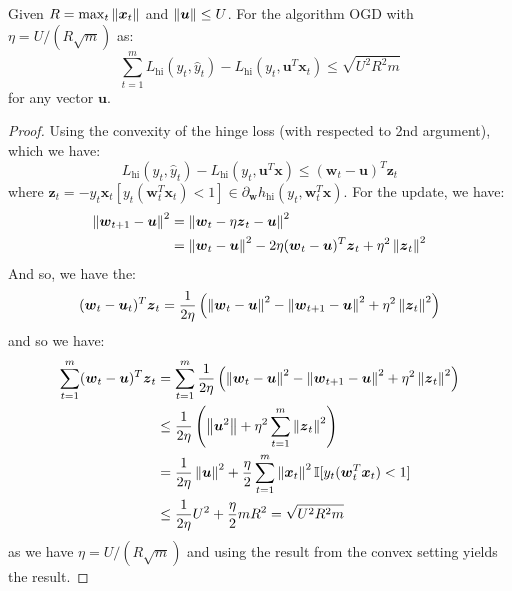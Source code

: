 \begin{theorem}
    Given $R = \max_t\left\lVert\boldsymbol x_t\right\rVert$ and $\left\lVert\boldsymbol u\right\rVert \le U$. For the algorithm OGD with $\eta = U/(R\sqrt{m})$ as:
    \begin{equation*}
        \sum^m_{t=1}L_\text{hi}(y_t, \hat{y}_t) - L_\text{hi}(y_t, \boldsymbol u^T\boldsymbol x_t) \le \sqrt{U^2R^2m}
    \end{equation*}
    for any vector $\boldsymbol u$.
\end{theorem}
\begin{proof}
    Using the convexity of the hinge loss (with respected to 2nd argument), which we have:
    \begin{equation*}
        L_\text{hi}(y_t,\hat{y}_t) - L_\text{hi}(y_t, \boldsymbol u^T\boldsymbol x) \le (\boldsymbol w_t - \boldsymbol u)^T\boldsymbol z_t
    \end{equation*}
    where $\boldsymbol z_t = -y_t\boldsymbol x_t[y_t(\boldsymbol w_t^T\boldsymbol x_t) < 1] \in \partial_{\boldsymbol w}h_\text{hi}(y_t, \boldsymbol w_t^T\boldsymbol x)$. For the update, we have:
    \begin{equation*}
    \begin{aligned}
        \left\lVert\boldsymbol w_{t+1} - \boldsymbol u\right\rVert^2 &= \left\lVert\boldsymbol w_t - \eta\boldsymbol z_t - \boldsymbol u\right\rVert^2 \\
        &= \left\lVert\boldsymbol w_t - \boldsymbol u\right\rVert^2 - 2\eta(\boldsymbol w_t- \boldsymbol u)^T\boldsymbol z_t + \eta^2\left\lVert\boldsymbol z_t\right\rVert^2
    \end{aligned}
    \end{equation*}
    And so, we have the:
    \begin{equation*}
        (\boldsymbol w_t - \boldsymbol u_t)^T\boldsymbol z_t = \frac{1}{2\eta}\left( \left\lVert\boldsymbol w_t - \boldsymbol u\right\rVert^2 - \left\lVert\boldsymbol w_{t+1} - \boldsymbol u\right\rVert^2 + \eta^2\left\lVert\boldsymbol z_t\right\rVert^2 \right)
    \end{equation*}
    and so we have:
    \begin{equation*}
    \begin{aligned}
        \sum^m_{t=1} (\boldsymbol w_t - \boldsymbol u)^T\boldsymbol z_t &= \sum^m_{t=1}\frac{1}{2\eta}\left( \left\lVert\boldsymbol w_t - \boldsymbol u\right\rVert^2 - \left\lVert\boldsymbol w_{t+1} - \boldsymbol u\right\rVert^2 + \eta^2\left\lVert\boldsymbol z_t\right\rVert^2 \right) \\
        &\le \frac{1}{2\eta}\left( \left\lVert\boldsymbol u^2\right\rVert + \eta^2\sum^m_{t=1}\left\lVert\boldsymbol z_t\right\rVert^2 \right) \\
        &=\frac{1}{2\eta}\left\lVert\boldsymbol u\right\rVert^2 + \frac{\eta}{2}\sum^m_{t=1}\left\lVert\boldsymbol x_t\right\rVert^2\mathbb{I}[y_t(\boldsymbol w_t^T\boldsymbol x_t) < 1] \\
        &\le \frac{1}{2\eta}U^2 + \frac{\eta}{2}mR^2 = \sqrt{U^2R^2m}
    \end{aligned}
    \end{equation*}
    as we have $\eta = U/(R\sqrt{m})$ and using the result from the convex setting yields the result. 
\end{proof}

